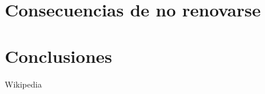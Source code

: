 \documentclass[11pt, a4paper]{report}
\begin{document}
        		\paragraph{}
        	
        
                
    \section{Consecuencias de no renovarse}
    	\paragraph{}
        
        
        
                
    \section{Conclusiones}
        

    
	\begin{thebibliography}{9}

		Wikipedia
        
	\end{thebibliography}
  
\end{document}
